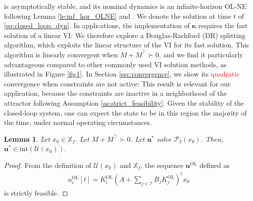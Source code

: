 \documentclass[letterpaper, 10 pt, conference]{ieeeconf}  %
\newcommand{\mc}{\mathcal}
\newcommand{\bs}{\boldsymbol}
\newcommand{\buol}{\boldsymbol{u}^{\mathrm{OL}}}
\newcommand{\uol}{u^{\mathrm{OL}}}
\newcommand{\Kol}{K^{\mathrm{OL}}}
\newcommand{\bu}{\boldsymbol{u}}
\newcommand{\red}[1]{\textcolor{red}{#1}}
\newcommand{\tsum}{\textstyle\sum}
\newtheorem{lemma}[theorem]{Lemma}
\begin{document}
is asymptotically stable, and its nominal dynamics is an infinite-horizon OL-NE following Lemma \ref{le:inf_hor_OLNE} and \cite[Lemma 2]{benenati2024linear}. We denote the solution at time $t$ of \eqref{eq:closed_loop_dyn}. In applications, the implementation of $\bs\kappa$ requires the fast solution of a linear VI: We therefore explore a Douglas-Rachford (DR) splitting algorithm, which exploits the linear structure of the VI for its fast solution. This algorithm is linearly convergent \cite[Proposition 6]{ferris1996operator} when $M+M^{\top}\succ 0$, and we find it particularly advantageous compared to other commonly used VI solution methods, as illustrated in Figure \ref{fig1}. In Section \ref{sec:convergence}, we show its \red{quadratic} convergence when constraints are not active: This result is relevant for our application, because the constraints are inactive in a neighborhood of the attractor following Assumption \ref{as:strict_feasibility}. Given the stability of the closed-loop system, one can expect the state to be in this region the majority of the time, under normal operating circumstances.
\begin{lemma}
    Let $x_0\in \mathbb{X}_f$. Let $M+M^{\top}\succ 0$. Let $\bu^*$ solve $\mc P_2(x_0)$. Then, $\bu^*\in\mathrm{int}(\mc U(x_0))$. 
\end{lemma}
\begin{proof}
    From the definition of $\mc U(x_0)$ and $\mathbb{X}_f$, the sequence $\buol$ defined as
    \begin{align}
        \uol_i[t] = \Kol_i(A + \tsum_{j\in\mc I} B_j\Kol_j)^t x_0
    \end{align}
    is strictly feasible. 
\end{proof}

\end{document}
